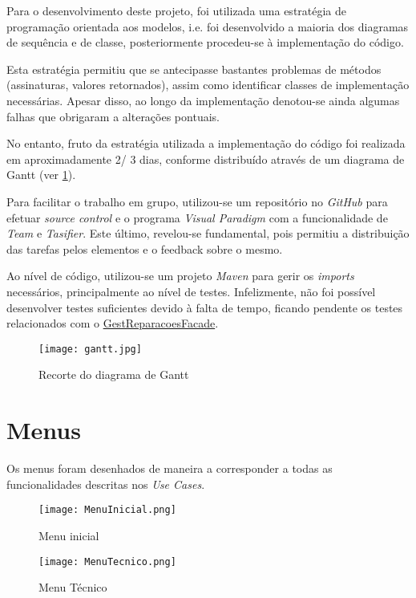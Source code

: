 \documentclass[relatorio.tex]{subfiles}
\begin{document}
Para o desenvolvimento deste projeto, foi utilizada uma estratégia de programação
orientada aos modelos, i.e. foi desenvolvido a maioria dos diagramas de sequência
e de classe, posteriormente procedeu-se à implementação do código.

Esta estratégia permitiu que se antecipasse bastantes problemas de métodos
(assinaturas, valores retornados), assim como identificar classes de implementação necessárias.
Apesar disso, ao longo da implementação denotou-se ainda algumas falhas que obrigaram a alterações pontuais.

No entanto, fruto da estratégia utilizada a implementação do código foi realizada em aproximadamente
2/ 3 dias, conforme distribuído através de um diagrama de Gantt (ver \ref{img:diagrama_gantt}).

Para facilitar o trabalho em grupo, utilizou-se um repositório no \textit{GitHub} para efetuar
\textit{source control} e o programa \textit{Visual Paradigm} com a funcionalidade de \textit{Team} e
\textit{Tasifier}.
Este último, revelou-se fundamental, pois permitiu a distribuição das tarefas pelos elementos
e o feedback sobre o mesmo.

Ao nível de código, utilizou-se um projeto \textit{Maven} para gerir os \textit{imports} necessários,
principalmente ao nível de testes. Infelizmente, não foi possível desenvolver testes suficientes
devido à falta de tempo, ficando pendente os testes relacionados com o \underline{GestReparacoesFacade}.

\begin{landscape}
    \begin{figure} [!ht]
        \centering
        \texttt{[image: gantt.jpg]}
        \caption{Recorte do diagrama de Gantt} \label{img:diagrama_gantt}
    \end{figure}
\end{landscape}

\section{Menus}

Os menus foram desenhados de maneira a corresponder a todas as funcionalidades descritas nos \textit{Use Cases}.

\begin{figure}[!ht]
    \centering
    \texttt{[image: MenuInicial.png]}
    \caption{Menu inicial}
\end{figure}

\begin{figure}[!ht]
    \centering
    \texttt{[image: MenuTecnico.png]}
    \caption{Menu Técnico}
\end{figure}
\end{document}
